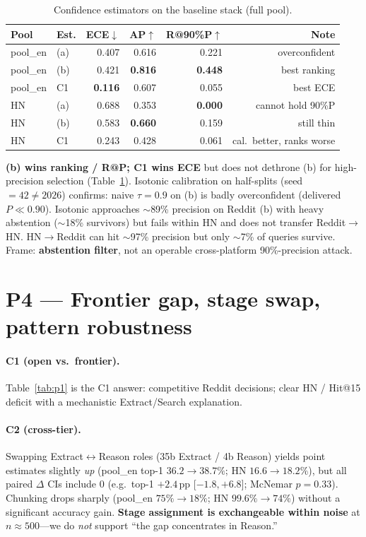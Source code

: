 \documentclass[sigplan,screen,nonacm,10pt]{acmart}
\begin{document}
\begin{table}[t]
\centering
\caption{Confidence estimators on the baseline stack (full pool).}
\label{tab:p2}
\small
\begin{tabular}{@{}llrrrr@{}}
\toprule
Pool & Est. & ECE$\downarrow$ & AP$\uparrow$ & R@90\%P$\uparrow$ & Note \\
\midrule
pool\_en & (a) & 0.407 & 0.616 & 0.221 & overconfident \\
pool\_en & (b) & 0.421 & \textbf{0.816} & \textbf{0.448} & best ranking \\
pool\_en & C1 & \textbf{0.116} & 0.607 & 0.055 & best ECE \\
HN & (a) & 0.688 & 0.353 & \textbf{0.000} & cannot hold 90\%P \\
HN & (b) & 0.583 & \textbf{0.660} & 0.159 & still thin \\
HN & C1 & 0.243 & 0.428 & 0.061 & cal.\ better, ranks worse \\
\bottomrule
\end{tabular}
\end{table}

\textbf{(b) wins ranking / R@P; C1 wins ECE} but does not dethrone (b) for
high-precision selection (Table~\ref{tab:p2}). Isotonic calibration on half-splits
(seed $=42\neq2026$) confirms: naive $\tau{=}0.9$ on (b) is badly overconfident
(delivered $P\ll0.90$). Isotonic approaches $\sim$89\% precision on Reddit (b)
with heavy abstention ($\sim$18\% survivors) but fails within HN and does not
transfer Reddit$\to$HN. HN$\to$Reddit can hit $\sim$97\% precision but only
$\sim$7\% of queries survive. Frame: \textbf{abstention filter}, not an operable
cross-platform 90\%-precision attack.

\section{P4 --- Frontier gap, stage swap, pattern robustness}

\paragraph{C1 (open vs.\ frontier).}
Table~\ref{tab:p1} is the C1 answer: competitive Reddit decisions; clear HN /
Hit@15 deficit with a mechanistic Extract/Search explanation.

\paragraph{C2 (cross-tier).}
Swapping Extract$\leftrightarrow$Reason roles (35b Extract / 4b Reason) yields
point estimates slightly \emph{up} (pool\_en top-1 $36.2{\to}38.7\%$; HN
$16.6{\to}18.2\%$), but all paired $\Delta$ CIs include 0 (e.g.\ top-1
$+2.4$\,pp [$-1.8,+6.8]$; McNemar $p{=}0.33$). Chunking drops sharply (pool\_en
$75\%{\to}18\%$; HN $99.6\%{\to}74\%$) without a significant accuracy gain.
\textbf{Stage assignment is exchangeable within noise} at $n{\approx}500$---we
do \emph{not} support ``the gap concentrates in Reason.''
\end{document}
